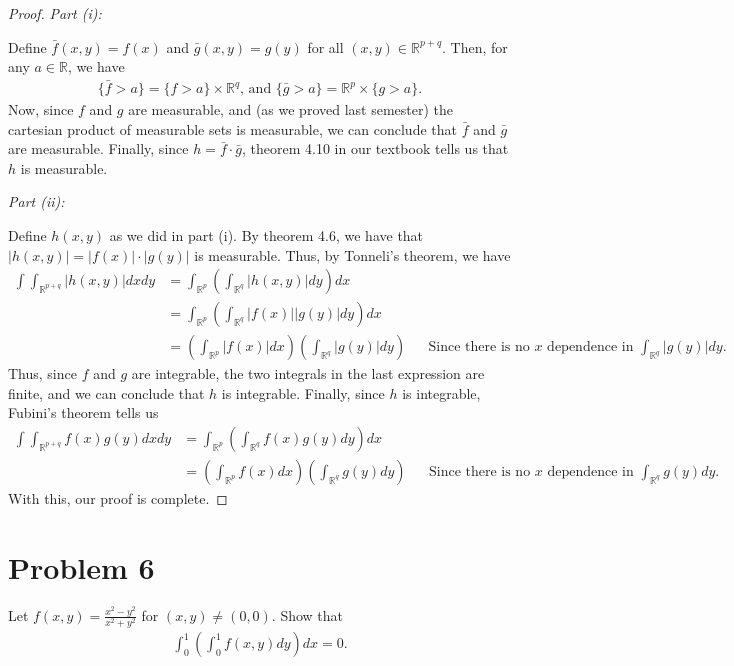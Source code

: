 \documentclass[10pt,a4paper]{article}
\makeatletter
\theoremstyle{theorem}
\newcommand{\proofpart}[2]{%
  \par
  \addvspace{\medskipamount}%
  \noindent\emph{Part #1: #2}\par\nobreak
  \addvspace{\smallskipamount}%
  \@afterheading
}
\theoremstyle{definition}
\makeatother
\begin{document}
\begin{proof}
\proofpart{(i)}{} Define $\bar{f}(x, y) = f(x)$ and $\bar{g}(x, y) = g(y)$ for all $(x, y) \in \mathbb{R}^{p + q}$. Then, for any $a \in \mathbb{R}$, we have
\begin{align*}
\{\bar{f} > a \} = \{f > a \} \times \mathbb{R}^q \text{, and } \{\bar{g} > a \} = \mathbb{R}^p \times \{g > a \}.
\end{align*}
Now, since $f$ and $g$ are measurable, and (as we proved last semester) the cartesian product of measurable sets is measurable, we can conclude that $\bar{f}$ and $\bar{g}$ are measurable. Finally, since $h = \bar{f} \cdot \bar{g}$, theorem 4.10 in our textbook tells us that $h$ is measurable.

\proofpart{(ii)}{} Define $h(x, y)$ as we did in part (i). By theorem 4.6, we have that $|h(x, y)| = |f(x)| \cdot |g(y)|$ is measurable. Thus, by Tonneli's theorem, we have
\begin{align*}
\int \int_{\mathbb{R}^{p + q}} |h(x, y)| dx dy &= \int_{\mathbb{R}^{p}} \left( \int_{\mathbb{R}^{q}} |h(x, y)| dy \right) dx\\
&= \int_{\mathbb{R}^{p}} \left( \int_{\mathbb{R}^{q}} |f(x)||g(y)| dy \right) dx\\
&= \left(\int_{\mathbb{R}^{p}} |f(x)| dx\right) \left( \int_{\mathbb{R}^{q}} |g(y)| dy \right) && \text{Since there is no } x \text{ dependence in } \int_{\mathbb{R}^{q}} |g(y)| dy.
\end{align*}
Thus, since $f$ and $g$ are integrable, the two integrals in the last expression are finite, and we can conclude that $h$ is integrable. Finally, since $h$ is integrable, Fubini's theorem tells us
\begin{align*}
\int \int_{\mathbb{R}^{p + q}} f(x)g(y) dx dy &= \int_{\mathbb{R}^{p}} \left( \int_{\mathbb{R}^{q}} f(x)g(y) dy \right) dx\\
&= \left(\int_{\mathbb{R}^{p}} f(x) dx\right) \left( \int_{\mathbb{R}^{q}} g(y) dy \right)&& \text{Since there is no } x \text{ dependence in } \int_{\mathbb{R}^{q}} g(y) dy.
\end{align*}
With this, our proof is complete.
\end{proof}

\section*{Problem 6}
Let $f(x, y) = \frac{x^2 - y^2}{x^2 + y^2}$ for $(x, y) \not = (0, 0)$. Show that 
\begin{align*}
\int_0^1 \left(\int_0^1 f(x, y)dy \right) dx = 0. 
\end{align*}
\end{document}
